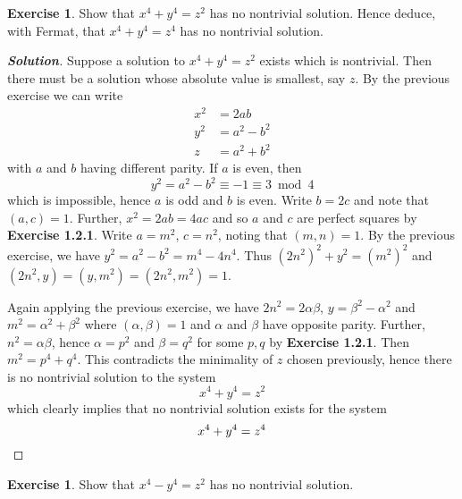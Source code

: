 \documentclass[12pt,leqno]{book}
\numberwithin{equation}{section}
\theoremstyle{definition}
\newtheorem{exer}[thm]{Exercise}
\newenvironment{Solution}{\begin{proof}[\textnormal{\textbf{Solution}}]}{\end{proof}}
\begin{document}
\begin{exer}
 Show that $x^4+y^4=z^2$ has no nontrivial solution. Hence deduce, with Fermat, that $x^4+y^4=z^4$ has no nontrivial solution. 
\end{exer}

\begin{Solution}
 Suppose a solution to $x^4+y^4=z^2$ exists which is nontrivial. Then there must be a solution whose absolute value is smallest, say $z$. By the previous exercise we can write \begin{align*}x^2&=2ab\\y^2&=a^2-b^2\\z&=a^2+b^2\end{align*} with $a$ and $b$ having different parity. If $a$ is even, then \[y^2=a^2-b^2\equiv-1\equiv3\bmod{4}\] which is impossible, hence $a$ is odd and $b$ is even. Write $b=2c$ and note that $(a,c)=1$. Further, $x^2=2ab=4ac$ and so $a$ and $c$ are perfect squares by \textbf{Exercise 1.2.1}. Write $a=m^2$, $c=n^2$, noting that $(m,n)=1$. By the previous exercise, we have $y^2=a^2-b^2=m^4-4n^4$. Thus $(2n^2)^2+y^2=(m^2)^2$ and $(2n^2,y)=(y,m^2)=(2n^2,m^2)=1$. 

Again applying the previous exercise, we have $2n^2=2\alpha\beta$, $y=\beta^2-\alpha^2$ and $m^2=\alpha^2+\beta^2$ where $(\alpha,\beta)=1$ and $\alpha$ and $\beta$ have opposite parity. Further, $n^2=\alpha\beta$, hence $\alpha=p^2$ and $\beta=q^2$ for some $p,q$ by \textbf{Exercise 1.2.1}. Then $m^2=p^4+q^4$. This contradicts the minimality of $z$ chosen previously, hence there is no nontrivial solution to the system \[x^4+y^4=z^2\] which clearly implies that no nontrivial solution exists for the system \[x^4+y^4=z^4\qedhere\]
\end{Solution}

\begin{exer}
 Show that $x^4-y^4=z^2$ has no nontrivial solution.
\end{exer}
\end{document}
